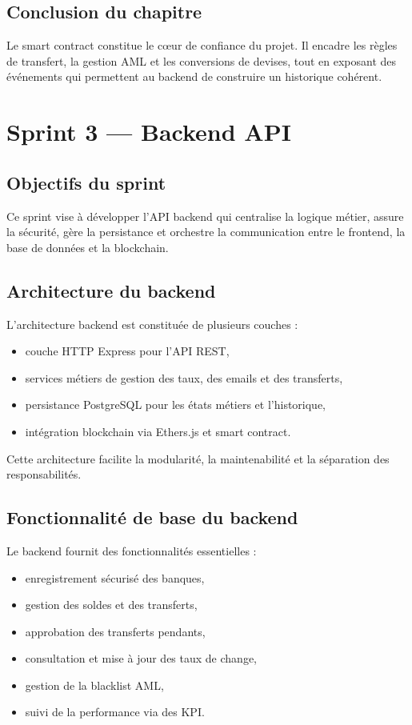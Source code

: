 \documentclass[a4paper,12pt]{report}
\begin{document}
\section{Conclusion du chapitre}
Le smart contract constitue le cœur de confiance du projet. Il encadre les règles de transfert, la gestion AML et les conversions de devises, tout en exposant des événements qui permettent au backend de construire un historique cohérent.

\chapter{Sprint 3 --- Backend API}
\section{Objectifs du sprint}
Ce sprint vise à développer l'API backend qui centralise la logique métier, assure la sécurité, gère la persistance et orchestre la communication entre le frontend, la base de données et la blockchain.

\section{Architecture du backend}
L'architecture backend est constituée de plusieurs couches :
\begin{itemize}[leftmargin=*,nosep]
  \item couche HTTP Express pour l'API REST,
  \item services métiers de gestion des taux, des emails et des transferts,
  \item persistance PostgreSQL pour les états métiers et l'historique,
  \item intégration blockchain via Ethers.js et smart contract.
\end{itemize}
Cette architecture facilite la modularité, la maintenabilité et la séparation des responsabilités.

\section{Fonctionnalité de base du backend}
Le backend fournit des fonctionnalités essentielles :
\begin{itemize}[leftmargin=*,nosep]
  \item enregistrement sécurisé des banques,
  \item gestion des soldes et des transferts,
  \item approbation des transferts pendants,
  \item consultation et mise à jour des taux de change,
  \item gestion de la blacklist AML,
  \item suivi de la performance via des KPI.
\end{itemize}
\end{document}
